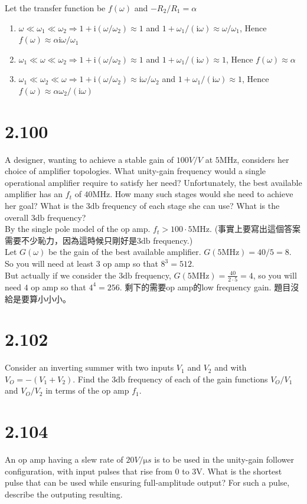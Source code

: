 \documentclass[12pt, a4paper]{article}
\newcommand{\svol}{\si{\volt}}
\newcommand{\sdb}{\si{\decibel}}
\newcommand{\img}{\mathrm{i}}
\begin{document}
Let the transfer function be $f(\omega)$ and $- R_2 / R_1 = \alpha$
\begin{enumerate}[label=(\alph*)]
  \item $\omega \ll \omega_1 \ll \omega_2 \Rightarrow 1 + \img(\omega / \omega_2) \approx 1$ and $1 + \omega_1/(\img \omega) \approx \omega / \omega_1$, Hence $f(\omega) \approx \alpha \img \omega / \omega_1$
  \item $\omega_1 \ll \omega \ll \omega_2 \Rightarrow 1 + \img(\omega / \omega_2) \approx 1$ and $1 + \omega_1/(\img \omega) \approx 1$, Hence $f(\omega) \approx \alpha$
  \item $\omega_1 \ll \omega_2 \ll \omega \Rightarrow 1 + \img(\omega / \omega_2) \approx \img \omega / \omega_2$ and $1 + \omega_1/(\img \omega) \approx 1$, Hence $f(\omega) \approx \alpha \omega_2 / (\img \omega)$
\end{enumerate}

\section{2.100}
A designer, wanting to achieve a stable gain of $100 \si{V/V}$ at $5 \si{\mega\hertz}$, considers her choice of amplifier topologies. What unity-gain frequency would a single operational amplifier require to satisfy her need? Unfortunately, the best available amplifier has an $f_t$ of $40 \si{\mega\hertz}$. How many such stages would she need to achieve her goal? What is the $3\sdb$ frequency of each stage she can use? What is the overall $3\sdb$ frequency? \\
By the single pole model of the op amp. $f_t > 100 \cdot 5 \si{\mega\hertz}$. (事實上要寫出這個答案需要不少恥力，因為這時候只剛好是$3 \sdb$ frequency.)\\
Let $G(\omega)$ be the gain of the best available amplifier. $G(5\si{\mega\hertz}) = 40 / 5 = 8$. So you will need at least $3$ op amp so that $8^3 = 512$.\\
But actually if we consider the $3\sdb$ frequency, $G(5 \si{\mega\hertz}) = \frac{40}{2 \cdot 5} = 4$, so you will need $4$ op amp so that $4^4 = 256$.
剩下的需要op amp的low frequency gain. 題目沒給是要算小小小。

\section{2.102}
Consider an inverting summer with two inputs $V_1$ and $V_2$ and with $V_O = -(V_1 + V_2)$. Find the $3 \sdb$ frequency of each of the gain functions $V_O / V_1$ and $V_O / V_2$ in terms of the op amp $f_1$.

\section{2.104}
An op amp having a slew rate of $20 \si{V/\micro s}$ is to be used in the unity-gain follower configuration, with input pulses that rise from $0$ to $3\svol$. What is the shortest pulse that can be used while ensuring full-amplitude output? For such a pulse, describe the outputing resulting.
\end{document}
